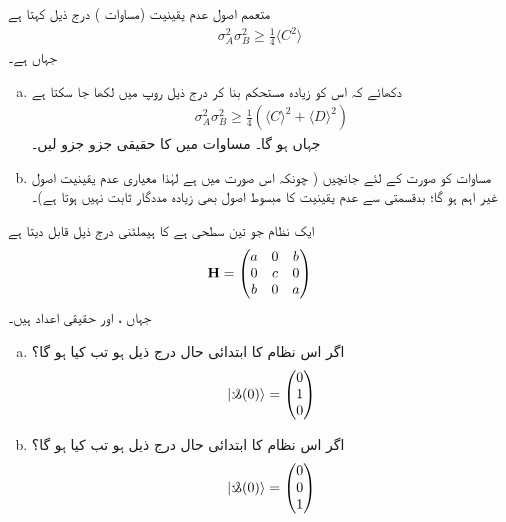 \quad متعمم اصول عدم یقینیت (مساوات ) درج ذیل کہتا ہے
 \begin{align*} 
\sigma_{A}^{2}\sigma_{B}^{2}\geq\frac{1}{4}\langle C^{2} \rangle 
 \end{align*} 
جہاں  ہے۔
\begin{enumerate}[a.] 
\item
دکھائے کہ اس کو زیادہ مستحکم بنا کر درج ذیل روپ میں لکھا جا سکتا ہے
 \begin{align}\label{مساوات_سوال_مستحکم_عدم_یقینیت} 
\sigma_{A}^{2}\sigma_{B}^{2}\geq\frac{1}{4}(\langle C\rangle^{2}+\langle D \rangle ^{2}) 
 \end{align} 
جہاں  ہو گا۔  مساوات  میں  کا حقیقی جزو  جزو لیں۔ 
\item
مساوات  کو  صورت کے لئے جانچیں ( چونکہ اس صورت میں  ہے لہٰذا معیاری عدم یقینیت اصول غیر اہم ہو گا؛ بدقسمتی سے عدم یقینیت کا مبسوط اصول بھی زیادہ مددگار ثابت نہیں ہوتا ہے)۔ 
\end{enumerate}

ایک نظام جو تین سطحی ہے کا ہیملٹنی درج ذیل قابل دیتا ہے
 \begin{align*} 
\bold{H}=\begin{pmatrix}
a&0&b\\
0&c&0\\
b&0&a
\end{pmatrix} 
 \end{align*} 
جہاں ،  اور  حقیقی اعداد ہیں۔
\begin{enumerate}[a.]
 \item
 اگر اس نظام کا ابتدائی حال درج ذیل ہو تب  کیا ہو گا؟ 
 \begin{align*} 
|\s(0) \rangle=\begin{pmatrix}
0\\
1\\
0
\end{pmatrix} 
 \end{align*} 
\item
 اگر اس نظام کا ابتدائی حال درج ذیل ہو تب  کیا ہو گا؟ 
 \begin{align*} 
| \s(0)\rangle =\begin{pmatrix}
0\\
0\\
1
\end{pmatrix} 
 \end{align*} 
\end{enumerate}

